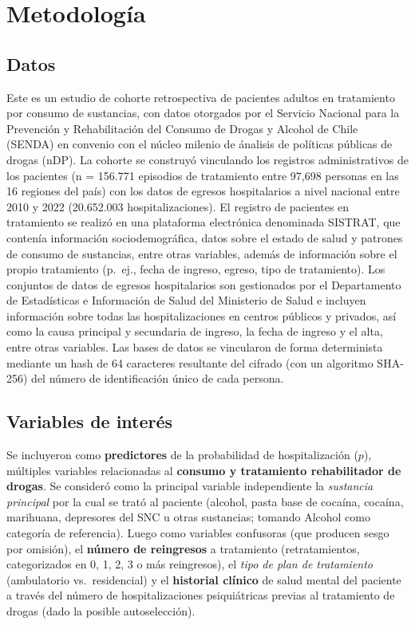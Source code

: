 \documentclass[
  spanish,
  10pt,
]{article}
\begin{document}
\section{Metodología}\label{metodologuxeda}

\subsection{Datos}\label{datos}

Este es un estudio de cohorte retrospectiva de pacientes adultos en
tratamiento por consumo de sustancias, con datos otorgados por el
Servicio Nacional para la Prevención y Rehabilitación del Consumo de
Drogas y Alcohol de Chile (SENDA) en convenio con el núcleo milenio de
ánalisis de políticas públicas de drogas (nDP). La cohorte se construyó
vinculando los registros administrativos de los pacientes (n = 156.771
episodios de tratamiento entre 97,698 personas en las 16 regiones del
país) con los datos de egresos hospitalarios a nivel nacional entre 2010
y 2022 (20.652.003 hospitalizaciones). El registro de pacientes en
tratamiento se realizó en una plataforma electrónica denominada SISTRAT,
que contenía información sociodemográfica, datos sobre el estado de
salud y patrones de consumo de sustancias, entre otras variables, además
de información sobre el propio tratamiento (p.~ej., fecha de ingreso,
egreso, tipo de tratamiento). Los conjuntos de datos de egresos
hospitalarios son gestionados por el Departamento de Estadísticas e
Información de Salud del Ministerio de Salud e incluyen información
sobre todas las hospitalizaciones en centros públicos y privados, así
como la causa principal y secundaria de ingreso, la fecha de ingreso y
el alta, entre otras variables. Las bases de datos se vincularon de
forma determinista mediante un hash de 64 caracteres resultante del
cifrado (con un algoritmo SHA-256) del número de identificación único de
cada persona.

\subsection{Variables de interés}\label{variables-de-interuxe9s}

Se incluyeron como \textbf{predictores} de la probabilidad de
hospitalización (\(p\)), múltiples variables relacionadas al
\textbf{consumo y tratamiento rehabilitador de drogas}. Se consideró
como la principal variable independiente la \emph{sustancia principal}
por la cual se trató al paciente (alcohol, pasta base de cocaína,
cocaína, marihuana, depresores del SNC u otras sustancias; tomando
Alcohol como categoría de referencia). Luego como variables confusoras
(que producen sesgo por omisión), el \textbf{número de reingresos} a
tratamiento (retratamientos, categorizados en 0, 1, 2, 3 o más
reingresos), el \emph{tipo de plan de tratamiento} (ambulatorio
vs.~residencial) y el \textbf{historial clínico} de salud mental del
paciente a través del número de hospitalizaciones psiquiátricas previas
al tratamiento de drogas (dado la posible autoselección).
\end{document}
